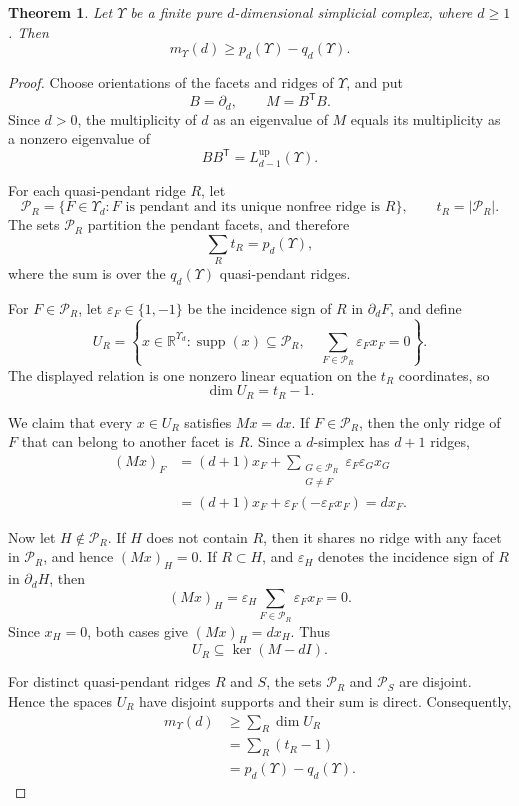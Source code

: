 \documentclass[10pt,a4paper]{amsart}
\newtheorem{theorem}{Theorem}
\newcommand{\R}{\mathbb{R}}
\begin{document}
\begin{theorem}\label{thm:simplicial-faria}
Let $\Upsilon$ be a finite pure $d$-dimensional simplicial complex, where $d\ge1$.  Then
\[
m_{\Upsilon}(d)\ge p_d(\Upsilon)-q_d(\Upsilon).
\]
\end{theorem}

\begin{proof}
Choose orientations of the facets and ridges of $\Upsilon$, and put
\[
B=\partial_d,\qquad M=B^{\mathsf T}B.
\]
Since $d>0$, the multiplicity of $d$ as an eigenvalue of $M$ equals its multiplicity as a nonzero eigenvalue of
\[
BB^{\mathsf T}=L_{d-1}^{\mathrm{up}}(\Upsilon).
\]

For each quasi-pendant ridge $R$, let
\[
\mathcal P_R
=\{F\in\Upsilon_d:F\text{ is pendant and its unique nonfree ridge is }R\},
\qquad
t_R=|\mathcal P_R|.
\]
The sets $\mathcal P_R$ partition the pendant facets, and therefore
\[
\sum_R t_R=p_d(\Upsilon),
\]
where the sum is over the $q_d(\Upsilon)$ quasi-pendant ridges.

For $F\in\mathcal P_R$, let $\varepsilon_F\in\{1,-1\}$ be the incidence sign of $R$ in $\partial_dF$, and define
\[
U_R=
\left\{
x\in\R^{\Upsilon_d}:
\operatorname{supp}(x)\subseteq\mathcal P_R,\quad
\sum_{F\in\mathcal P_R}\varepsilon_Fx_F=0
\right\}.
\]
The displayed relation is one nonzero linear equation on the $t_R$ coordinates, so
\[
\dim U_R=t_R-1.
\]

We claim that every $x\in U_R$ satisfies $Mx=dx$.  If $F\in\mathcal P_R$, then the only ridge of $F$ that can belong to another facet is $R$.  Since a $d$-simplex has $d+1$ ridges,
\[
\begin{aligned}
(Mx)_F
&=(d+1)x_F+
\sum_{\substack{G\in\mathcal P_R\\G\ne F}}
\varepsilon_F\varepsilon_Gx_G\\
&=(d+1)x_F+
\varepsilon_F\left(-\varepsilon_Fx_F\right)
=dx_F.
\end{aligned}
\]

Now let $H\notin\mathcal P_R$.  If $H$ does not contain $R$, then it shares no ridge with any facet in $\mathcal P_R$, and hence $(Mx)_H=0$.  If $R\subset H$, and $\varepsilon_H$ denotes the incidence sign of $R$ in $\partial_dH$, then
\[
(Mx)_H
=\varepsilon_H\sum_{F\in\mathcal P_R}\varepsilon_Fx_F
=0.
\]
Since $x_H=0$, both cases give $(Mx)_H=dx_H$.  Thus
\[
U_R\subseteq\ker(M-dI).
\]

For distinct quasi-pendant ridges $R$ and $S$, the sets $\mathcal P_R$ and $\mathcal P_S$ are disjoint.  Hence the spaces $U_R$ have disjoint supports and their sum is direct.  Consequently,
\[
\begin{aligned}
m_{\Upsilon}(d)
&\ge\sum_R\dim U_R\\
&=\sum_R(t_R-1)\\
&=p_d(\Upsilon)-q_d(\Upsilon).
\end{aligned}
\]
\end{proof}
\end{document}
